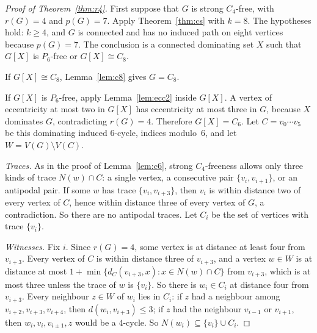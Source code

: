 \documentclass[ASNA]{USG}
\theoremstyle{WBstyletwo}
\numberwithin{equation}{section}
\newcommand{\pp}{p}
\begin{document}
\begin{proof}[Proof of Theorem~\ref{thm:r4}]
First suppose that $G$ is strong $C_4$-free, with $r(G)=4$ and $\pp(G)=7$. Apply Theorem~\ref{thm:cs} with $k=8$. The hypotheses hold: $k\ge 4$, and $G$ is connected and has no induced path on eight vertices because $\pp(G)=7$. The conclusion is a connected dominating set $X$ such that $G[X]$ is $P_6$-free or $G[X]\cong C_8$.

If $G[X]\cong C_8$, Lemma~\ref{lem:c8} gives $G=C_8$.

If $G[X]$ is $P_6$-free, apply Lemma~\ref{lem:ecc2} inside $G[X]$. A vertex of eccentricity at most two in $G[X]$ has eccentricity at most three in $G$, because $X$ dominates $G$, contradicting $r(G)=4$. Therefore $G[X]=C_6$. Let $C=v_0\cdots v_5$ be this dominating induced $6$-cycle, indices modulo~$6$, and let $W=V(G)\setminus V(C)$.

\emph{Traces.} As in the proof of Lemma~\ref{lem:c6}, strong $C_4$-freeness allows only three kinds of trace $N(w)\cap C$: a single vertex, a consecutive pair $\{v_i,v_{i+1}\}$, or an antipodal pair. If some $w$ has trace $\{v_i,v_{i+3}\}$, then $v_i$ is within distance two of every vertex of $C$, hence within distance three of every vertex of $G$, a contradiction. So there are no antipodal traces. Let $C_i$ be the set of vertices with trace $\{v_i\}$.

\emph{Witnesses.} Fix $i$. Since $r(G)=4$, some vertex is at distance at least four from $v_{i+3}$. Every vertex of $C$ is within distance three of $v_{i+3}$, and a vertex $w\in W$ is at distance at most $1+\min\{d_C(v_{i+3},x):x\in N(w)\cap C\}$ from $v_{i+3}$, which is at most three unless the trace of $w$ is $\{v_i\}$. So there is $w_i\in C_i$ at distance four from $v_{i+3}$. Every neighbour $z\in W$ of $w_i$ lies in $C_i$: if $z$ had a neighbour among $v_{i+2},v_{i+3},v_{i+4}$, then $d(w_i,v_{i+3})\le 3$; if $z$ had the neighbour $v_{i-1}$ or $v_{i+1}$, then $w_i,v_i,v_{i\pm 1},z$ would be a $4$-cycle. So $N(w_i)\subseteq\{v_i\}\cup C_i$.


\end{proof}
\end{document}
